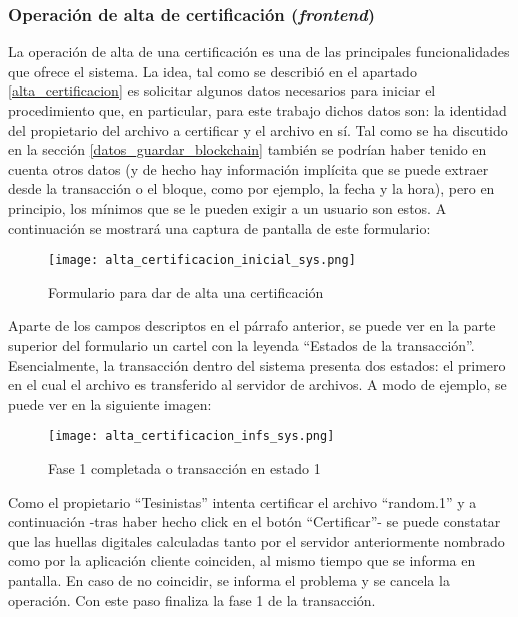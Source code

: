 \subsubsection{Operación de alta de certificación (\textit{frontend})}
\label{operacion_alta_certificacion}

La operación de alta de una certificación es una de las principales funcionalidades que ofrece el sistema. La idea, tal como se describió en el apartado \ref{alta_certificacion} es solicitar algunos datos necesarios para iniciar el procedimiento que, en particular, para este trabajo dichos datos son: la identidad del propietario del archivo a certificar y el archivo en sí. Tal como se ha discutido en la sección \ref{datos_guardar_blockchain} también se podrían haber tenido en cuenta otros datos (y de hecho hay información implícita que se puede extraer desde la transacción o el bloque, como por ejemplo, la fecha y la hora), pero en principio, los mínimos que se le pueden exigir a un usuario son estos. A continuación se mostrará una captura de pantalla de este formulario:

\begin{figure}[H]
  \texttt{[image: alta\_certificacion\_inicial\_sys.png]}
  \centering
  \caption{Formulario para dar de alta una certificación}
  \label{fig:alta-certificacion-inicial-sys}
\end{figure}

Aparte de los campos descriptos en el párrafo anterior, se puede ver en la parte superior del formulario un cartel con la leyenda ``Estados de la transacción''. Esencialmente, la transacción dentro del sistema presenta dos estados: el primero en el cual el archivo es transferido al servidor de archivos. A modo de ejemplo, se puede ver en la siguiente imagen:

\begin{figure}[H]
  \texttt{[image: alta\_certificacion\_infs\_sys.png]}
  \centering
  \caption{Fase 1 completada o transacción en estado 1}
  \label{fig:alta-certificacion-infs-sys}
\end{figure}

Como el propietario ``Tesinistas'' intenta certificar el archivo ``random.1'' y a continuación -tras haber hecho click en el botón ``Certificar''- se puede constatar que las huellas digitales calculadas tanto por el servidor anteriormente nombrado como por la aplicación cliente coinciden, al mismo tiempo que se informa en pantalla. En caso de no coincidir, se informa el problema y se cancela la operación. Con este paso finaliza la fase 1 de la transacción.

